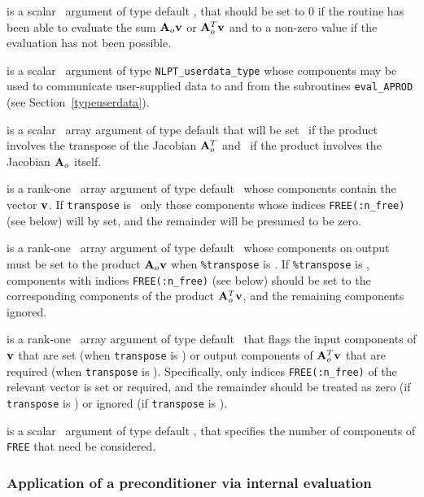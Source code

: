 \documentclass{galahad}
\begin{document}
\begin{description}
 is a scalar \intentout\ argument of type default \integer,
that should be set to 0 if the routine has been able to evaluate the
sum ${\mathbf{A}}_o {\mathbf{v}}$ or ${\mathbf{A}}_o^T{\mathbf{v}}$
and to a non-zero value if the evaluation has not been possible.

 is a scalar \intentinout\ argument of type
{\tt NLPT\_userdata\_type} whose components may be used
to communicate user-supplied data to and from the subroutines
{\tt eval\_APROD}
(see Section~\ref{typeuserdata}).

 is a scalar \intentin\ array argument of type
default that will be set \true\ if the product involves the transpose
of the Jacobian ${\mathbf{A}}_o^T$ and \false\ if the product involves
the Jacobian ${\mathbf{A}}_o$ itself.

 is a rank-one \intentin\ array argument of type default \realdp\
whose components contain the vector ${\mathbf{v}}$. If {\tt transpose} is \false\
only those components whose indices {\tt FREE(:n\_free)} (see below)
will by set, and the remainder will be presumed to be zero.

 is a rank-one \intentout\ array argument of type default \realdp\
whose components on output must be set to the
product ${\mathbf{A}}_o {\mathbf{v}}$ when {\tt \%transpose} is \false. If
{\tt \%transpose} is \true, components with indices {\tt FREE(:n\_free)}
(see below) should be set to the corresponding components of the
product ${\mathbf{A}}_o^T {\mathbf{v}}$, and the remaining components ignored.

\itt{FREE} is a rank-one \intentin\ array argument of
type default \integer\ that flags the input components of ${\mathbf{v}}$ that are set
(when {\tt transpose} is \false) or output components of ${\mathbf{A}}_o^T {\mathbf{v}}$ that
are required (when {\tt transpose} is \true). Specifically, only indices
{\tt FREE(:n\_free)} of the relevant vector is set or required, and the
remainder should be treated as zero (if {\tt transpose} is \false)
or ignored  (if {\tt transpose} is \true).

\itt{n\_free} is a scalar \intentin\ argument of type default \integer,
that specifies the number of components of {\tt FREE} that need be considered.

\end{description}


\subsubsection{Application of a preconditioner via internal evaluation
\label{prec}}
\end{document}
